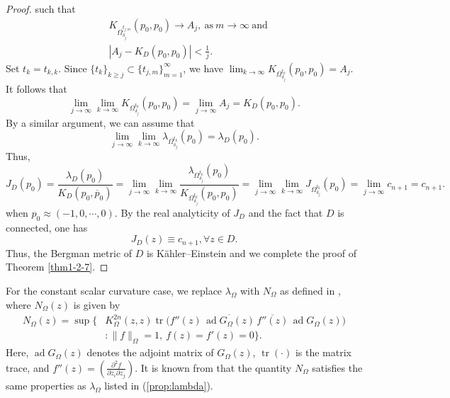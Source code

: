 \documentclass[a4paper,centertags,oneside,12pt]{amsart}
\numberwithin{equation}{section}
\begin{document}
\begin{proof}
such that
\begin{equation*}
\begin{split}
    &K_{\Omega_{\delta_j}^{t_{j, m}}}(p_0, p_0)\rightarrow A_j,~\text{as}~m\rightarrow \infty~\text{and}\\
    &|A_j-K_D(p_0, p_0)|<\frac{1}{j}.
  \end{split}  
\end{equation*}
Set $t_k=t_{k, k}$. Since $\{t_k\}_{k\geq j}\subset\{t_{j, m}\}_{m=1}^\infty$, we have $\lim_{k\rightarrow\infty}K_{\Omega_{\delta_j}^{t_k}}(p_0, p_0)=A_j$. It follows that 
\begin{equation*}
    \lim_{j\rightarrow\infty}\lim_{k\rightarrow\infty}K_{\Omega_{\delta_j}^{t_k}}(p_0, p_0)=\lim_{j\rightarrow\infty}A_j=K_{D}(p_0, p_0).
\end{equation*}
By a similar argument, we can assume that 
\begin{equation*}
    \lim_{j\rightarrow\infty}\lim_{k\rightarrow\infty}\lambda_{\Omega_{\delta_j}^{t_k}}(p_0)=\lambda_{D}(p_0).
\end{equation*}
Thus,  
\begin{equation*}
    J_D(p_0)=\frac{\lambda_D(p_0)}{K_D(p_0, \overline p_0)}=\lim_{j\rightarrow\infty}\lim_{k\rightarrow\infty}\frac{\lambda_{\Omega_{\delta_j}^{t_k}}(p_0)}{K_{\Omega_{\delta_j}^{t_k}}(p_0, p_0)}=\lim_{j\rightarrow\infty}\lim_{k\rightarrow\infty}J_{\Omega_{\delta_j}^{t_k}}(p_0)=\lim_{j\rightarrow \infty} c_{n+1}=c_{n+1}.
\end{equation*}
when $p_0\approx(-1, 0, \cdots, 0)$.
By the real analyticity  of $J_D$ and the fact that $D$ is  connected, one has $$J_D(z)\equiv c_{n+1}, \forall z\in D.$$
Thus, the Bergman metric of $D$ is K\"ahler--Einstein and we complete the proof  of Theorem \ref{thm1-2-7}.
\end{proof}
For the constant scalar curvature case, we replace $\lambda_{\Omega}$ with $N_{\Omega}$ as defined in \cite{KYu96}, where $N_\Omega(z)$ is given by
\begin{equation*}
\begin{aligned}
N_\Omega(z)=\sup\Big\{
& K^{2n}_{\Omega}(z, z) \operatorname{tr}\Big( f''(z)\,\overline{\operatorname{ad} G_{\Omega}(z)}\,\overline{f''(z)}\,\operatorname{ad} G_{\Omega}(z) \Big) \\
& : \|f\|_{\Omega}=1,\ f(z)=f'(z)=0
\Big\}.
\end{aligned}
\end{equation*}
Here, $\operatorname{ad} G_{\Omega}(z)$ denotes the adjoint matrix of $G_{\Omega}(z)$, $\operatorname{tr}(\cdot)$ is the matrix trace, and $f''(z)=\left(\frac{\partial^2 f}{\partial z_i\partial z_j}\right)$. It is known from \cite[Prop. 2.2, Prop. 2.5]{KYu96} that the quantity $N_{\Omega}$ satisfies the same properties as $\lambda_{\Omega}$ listed in (\ref{prop:lambda}).
\end{document}
